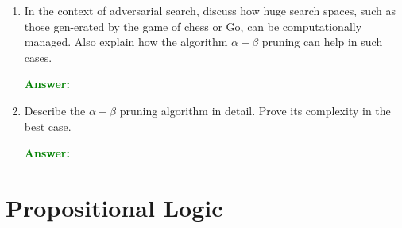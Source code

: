 \documentclass[12pt]{article}
\begin{document}
\begin{enumerate}[label=\textbf{AS.\arabic*}]
    \item In the context of adversarial search, discuss how huge search spaces, such as those gen-erated by the game of chess or Go, can be computationally managed.
          Also explain how the algorithm $\alpha - \beta$ pruning can help in such cases.

          \textcolor{green}{\textbf{Answer:}}

    \item Describe the $\alpha - \beta$ pruning algorithm in detail. Prove its complexity in the best case.

          \textcolor{green}{\textbf{Answer:}}
\end{enumerate}
\section{Propositional Logic}
\end{document}
